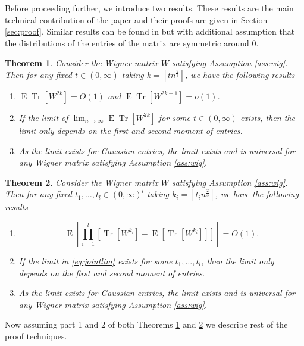 \documentclass[12pt]{article}
\numberwithin{equation}{section}
\newtheorem{theorem}{Theorem}[section]
\numberwithin{equation}{section}
\theoremstyle{definition}
\DeclareMathOperator{\E}{E} \DeclareMathOperator{\var}{Var}
\DeclareMathOperator{\Tr}{Tr}
\renewcommand{\1}{\bf 1}
\begin{document}
\noindent 
Before proceeding further, we introduce two results. These results are the main technical contribution of the paper and their proofs are given in Section \ref{sec:proof}. Similar results can be found in \citet{sosh} but with additional assumption that the distributions of the entries of the matrix are symmetric around $0$. 
\begin{theorem}\label{thm:traceconvergence}
Consider the Wigner matrix $W$ satisfying Assumption \ref{ass:wig}. Then for any fixed $t \in (0,\infty)$ taking $k= \left[tn^{\frac{2}{3}}\right]$, we have the following results 
\begin{enumerate}
\item $\E\Tr\left[ W^{2k} \right]=O(1)$ and $\E\Tr\left[W^{2k+1}\right]=o(1)$.
\item If the limit of $\lim_{n \to \infty} \E\Tr\left[ W^{2k} \right] $ for some $t\in (0,\infty)$ exists, then the limit only depends on the first and second moment of entries. 
\item As the limit exists for Gaussian entries, the limit exists and is universal for any Wigner matrix satisfying Assumption \ref{ass:wig}. 
\end{enumerate}
\end{theorem}
\begin{theorem}\label{thm:jointmom}
Consider the Wigner matrix $W$ satisfying Assumption \ref{ass:wig}. Then for any fixed $t_{1}, \ldots, t_{l} \in (0,\infty)^{l} $ taking $k_{i}= \left[ t_{i} n^{\frac{2}{3}} \right]$, we have the following results
\begin{enumerate}
\item 
\begin{equation}\label{eq:jointlim}
\E\left[ \prod_{i=1}^{l} \left[\Tr\left[W^{k_{i}}\right] - \E\left[  \Tr\left[W^{k_{i}}\right]\right] \right] \right]=O(1).
\end{equation}
\item If the limit in \eqref{eq:jointlim} exists for some $t_{1},\ldots , t_{l}$, then the limit only depends on the first and second moment of entries.
\item As the limit exists for Gaussian entries, the limit exists and is universal for any Wigner matrix satisfying Assumption \ref{ass:wig}.
\end{enumerate}
\end{theorem}
Now assuming part 1 and 2 of both Theorems \ref{thm:traceconvergence} and \ref{thm:jointmom} we describe rest of the proof techniques. 
\end{document}
